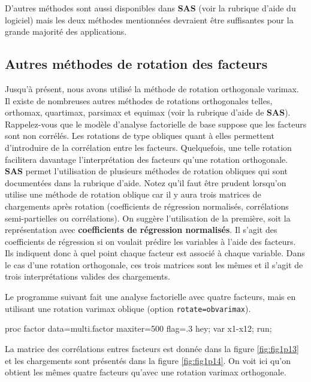 \documentclass[
  11pt,
  letterpaper,
]{book}
\newenvironment{Shaded}{\begin{snugshade}}{\end{snugshade}}
\newcommand{\NormalTok}[1]{#1}
\theoremstyle{definition}
\theoremstyle{definition}
\theoremstyle{definition}
\theoremstyle{definition}
\theoremstyle{remark}
\begin{document}
D'autres méthodes sont aussi disponibles dans \textbf{SAS} (voir la rubrique d'aide du logiciel) mais les deux méthodes mentionnées devraient être suffisantes pour la grande majorité des applications.

\hypertarget{autres-muxe9thodes-de-rotation-des-facteurs}{%
\subsection{Autres méthodes de rotation des facteurs}\label{autres-muxe9thodes-de-rotation-des-facteurs}}

Jusqu'à présent, nous avons utilisé la méthode de rotation orthogonale varimax. Il existe de nombreuses autres méthodes de rotations orthogonales telles, orthomax, quartimax, parsimax et equimax (voir la rubrique d'aide de \textbf{SAS}). Rappelez-vous que le modèle d'analyse factorielle de base suppose que les facteurs sont non corrélés. Les rotations de type obliques quant à elles permettent d'introduire de la corrélation entre les facteurs. Quelquefois, une telle rotation facilitera davantage l'interprétation des facteurs qu'une rotation orthogonale. \textbf{SAS} permet l'utilisation de plusieurs méthodes de rotation obliques qui sont documentées dans la rubrique d'aide. Notez qu'il faut être prudent lorsqu'on utilise une méthode de rotation oblique car il y aura trois matrices de chargements après rotation (coefficients de régression normalisés, corrélations semi-partielles ou corrélations). On suggère l'utilisation de la première, soit la représentation avec \textbf{coefficients de régression normalisés}. Il s'agit des coefficients de régression si on voulait prédire les variables à l'aide des facteurs. Ils indiquent donc à quel point chaque facteur est associé à chaque variable. Dans le cas d'une rotation orthogonale, ces trois matrices sont les mêmes et il s'agit de trois interprétations valides des chargements.

Le programme suivant fait une analyse factorielle avec quatre facteurs, mais en utilisant une rotation varimax oblique (option \texttt{rotate=obvarimax}).

\begin{Shaded}
\begin{Highlighting}[]
\NormalTok{proc factor data=multi.factor}
\NormalTok{maxiter=500 flag=.3 hey;}
\NormalTok{var x1{-}x12;}
\NormalTok{run;}
\end{Highlighting}
\end{Shaded}

La matrice des corrélations entres facteurs est donnée dans la figure \ref{fig:fig1p13} et les chargements sont présentés dans la figure \ref{fig:fig1p14}. On voit ici qu'on obtient les mêmes quatre facteurs qu'avec une rotation varimax orthogonale.
\end{document}
